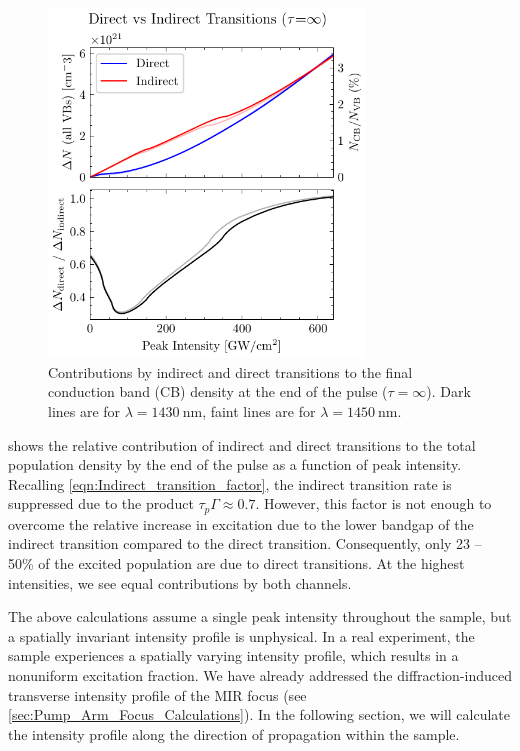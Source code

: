 \begin{figure}
	\centering
	\includegraphics[width=0.75\textwidth]{figures/chap4/Direct_vs_Indirect_Trans.pdf}
	\caption{Contributions by indirect and direct transitions to the final conduction band (CB) density at the end of the pulse ($\tau = \infty$). Dark lines are for $\lambda = 1430 \ \textrm{nm}$, faint lines are for $\lambda = 1450 \ \textrm{nm}$.}
	\label{fig:Direct_vs_Indirect_Trans}
\end{figure}

 shows the relative contribution of indirect and direct transitions to the total population density by the end of the pulse as a function of peak intensity. Recalling \cref{eqn:Indirect_transition_factor}, the indirect transition rate is suppressed due to the product $\tau_p \Gamma \approx 0.7$. However, this factor is not enough to overcome the relative increase in excitation due to the lower bandgap of the indirect transition compared to the direct transition. Consequently, only {23 -- 50\%} of the excited population are due to direct transitions. At the highest intensities, we see equal contributions by both channels.

The above calculations assume a single peak intensity throughout the sample, but a spatially invariant intensity profile is unphysical. In a real experiment, the sample experiences a spatially varying intensity profile, which results in a nonuniform excitation fraction. We have already addressed the diffraction-induced transverse intensity profile of the MIR focus (see \cref{sec:Pump_Arm_Focus_Calculations}). In the following section, we will calculate the intensity profile along the direction of propagation within the sample.


